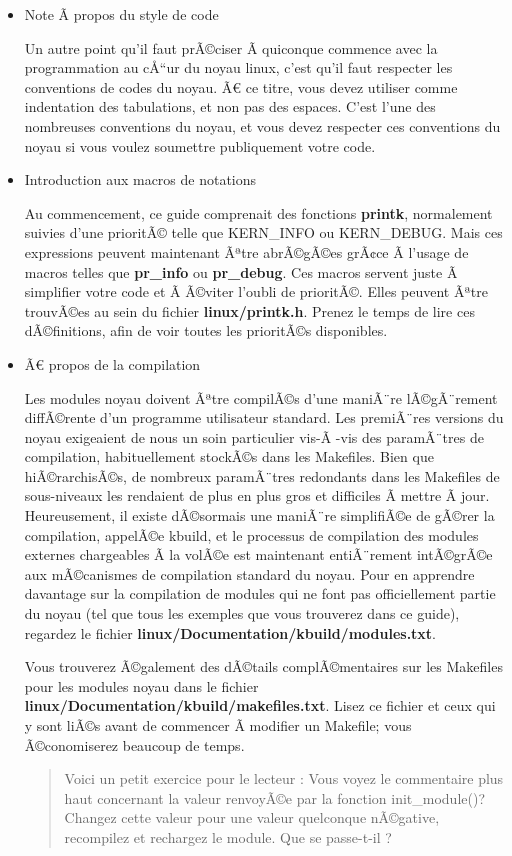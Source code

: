 \documentclass[11pt]{article}
\begin{document}
\begin{itemize}
\item Note Ã  propos du style de code
\label{sec-4-1-0-1}

Un autre point qu'il faut prÃ©ciser Ã  quiconque commence avec la programmation au cÅ“ur du noyau linux, c'est qu'il faut respecter les conventions de codes du noyau. Ã€ ce titre, vous devez utiliser comme indentation des tabulations, et non pas des espaces. C'est l'une des nombreuses conventions du noyau, et vous devez respecter ces conventions du noyau si vous voulez soumettre publiquement votre code.

\item Introduction aux macros de notations
\label{sec-4-1-0-2}

Au commencement, ce guide comprenait des fonctions \textbf{printk}, normalement suivies d'une prioritÃ© telle que KERN\_INFO ou KERN\_DEBUG. Mais ces expressions peuvent maintenant Ãªtre abrÃ©gÃ©es grÃ¢ce Ã  l'usage de macros telles que \textbf{pr\_info} ou \textbf{pr\_debug}. Ces macros servent juste Ã  simplifier votre code et Ã  Ã©viter l'oubli de prioritÃ©. Elles peuvent Ãªtre trouvÃ©es au sein du fichier \textbf{linux/printk.h}. Prenez le temps de lire ces dÃ©finitions, afin de voir toutes les prioritÃ©s disponibles.

\item Ã€ propos de la compilation
\label{sec-4-1-0-3}

Les modules noyau doivent Ãªtre compilÃ©s d'une maniÃ¨re lÃ©gÃ¨rement diffÃ©rente d'un programme utilisateur standard. Les premiÃ¨res versions du noyau exigeaient de nous un soin particulier vis-Ã -vis des paramÃ¨tres de compilation, habituellement stockÃ©s dans les Makefiles. Bien que hiÃ©rarchisÃ©s, de nombreux paramÃ¨tres redondants dans les Makefiles de sous-niveaux les rendaient de plus en plus gros et difficiles Ã  mettre Ã  jour. Heureusement, il existe dÃ©sormais une maniÃ¨re simplifiÃ©e de gÃ©rer la compilation, appelÃ©e kbuild, et le processus de compilation des modules externes chargeables Ã  la volÃ©e est maintenant entiÃ¨rement intÃ©grÃ©e aux mÃ©canismes de compilation standard du noyau. Pour en apprendre davantage sur la compilation de modules qui ne font pas officiellement partie du noyau (tel que tous les exemples que vous trouverez dans ce guide), regardez le fichier \textbf{linux/Documentation/kbuild/modules.txt}.

Vous trouverez Ã©galement des dÃ©tails complÃ©mentaires sur les Makefiles pour les modules noyau dans le fichier \textbf{linux/Documentation/kbuild/makefiles.txt}. Lisez ce fichier et ceux qui y sont liÃ©s avant de commencer Ã  modifier un Makefile; vous Ã©conomiserez beaucoup de temps.

\begin{quote}
Voici un petit exercice pour le lecteur : Vous voyez le commentaire plus haut concernant la valeur renvoyÃ©e par la fonction init\_module()? Changez cette valeur pour une valeur quelconque nÃ©gative, recompilez et rechargez le module. Que se passe-t-il ?
\end{quote}
\end{itemize}
\end{document}
